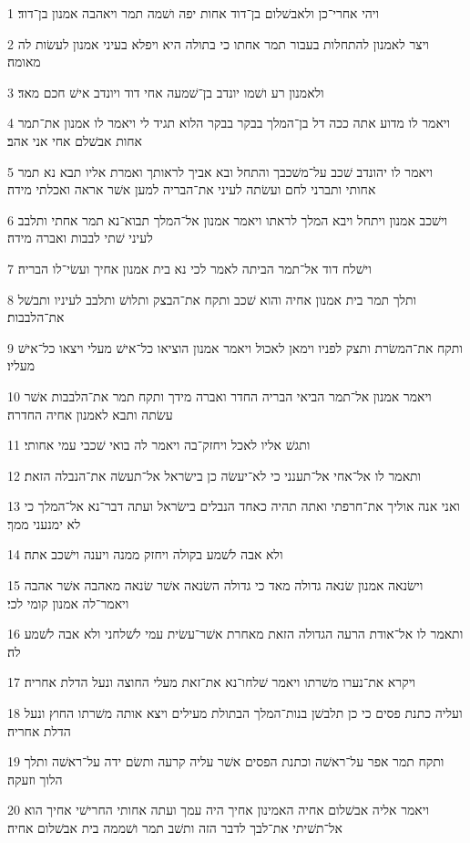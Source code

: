 \par 1 ויהי אחרי־כן ולאבשׁלום בן־דוד אחות יפה ושׁמה תמר ויאהבה אמנון בן־דוד׃
\par 2 ויצר לאמנון להתחלות בעבור תמר אחתו כי בתולה היא ויפלא בעיני אמנון לעשׂות לה מאומה׃
\par 3 ולאמנון רע ושׁמו יונדב בן־שׁמעה אחי דוד ויונדב אישׁ חכם מאד׃
\par 4 ויאמר לו מדוע אתה ככה דל בן־המלך בבקר בבקר הלוא תגיד לי ויאמר לו אמנון את־תמר אחות אבשׁלם אחי אני אהב׃
\par 5 ויאמר לו יהונדב שׁכב על־משׁכבך והתחל ובא אביך לראותך ואמרת אליו תבא נא תמר אחותי ותברני לחם ועשׂתה לעיני את־הבריה למען אשׁר אראה ואכלתי מידה׃
\par 6 וישׁכב אמנון ויתחל ויבא המלך לראתו ויאמר אמנון אל־המלך תבוא־נא תמר אחתי ותלבב לעיני שׁתי לבבות ואברה מידה׃
\par 7 וישׁלח דוד אל־תמר הביתה לאמר לכי נא בית אמנון אחיך ועשׂי־לו הבריה׃
\par 8 ותלך תמר בית אמנון אחיה והוא שׁכב ותקח את־הבצק ותלושׁ ותלבב לעיניו ותבשׁל את־הלבבות׃
\par 9 ותקח את־המשׂרת ותצק לפניו וימאן לאכול ויאמר אמנון הוציאו כל־אישׁ מעלי ויצאו כל־אישׁ מעליו׃
\par 10 ויאמר אמנון אל־תמר הביאי הבריה החדר ואברה מידך ותקח תמר את־הלבבות אשׁר עשׂתה ותבא לאמנון אחיה החדרה׃
\par 11 ותגשׁ אליו לאכל ויחזק־בה ויאמר לה בואי שׁכבי עמי אחותי׃
\par 12 ותאמר לו אל־אחי אל־תענני כי לא־יעשׂה כן בישׂראל אל־תעשׂה את־הנבלה הזאת׃
\par 13 ואני אנה אוליך את־חרפתי ואתה תהיה כאחד הנבלים בישׂראל ועתה דבר־נא אל־המלך כי לא ימנעני ממך׃
\par 14 ולא אבה לשׁמע בקולה ויחזק ממנה ויענה וישׁכב אתה׃
\par 15 וישׂנאה אמנון שׂנאה גדולה מאד כי גדולה השׂנאה אשׁר שׂנאה מאהבה אשׁר אהבה ויאמר־לה אמנון קומי לכי׃
\par 16 ותאמר לו אל־אודת הרעה הגדולה הזאת מאחרת אשׁר־עשׂית עמי לשׁלחני ולא אבה לשׁמע לה׃
\par 17 ויקרא את־נערו משׁרתו ויאמר שׁלחו־נא את־זאת מעלי החוצה ונעל הדלת אחריה׃
\par 18 ועליה כתנת פסים כי כן תלבשׁן בנות־המלך הבתולת מעילים ויצא אותה משׁרתו החוץ ונעל הדלת אחריה׃
\par 19 ותקח תמר אפר על־ראשׁה וכתנת הפסים אשׁר עליה קרעה ותשׂם ידה על־ראשׁה ותלך הלוך וזעקה׃
\par 20 ויאמר אליה אבשׁלום אחיה האמינון אחיך היה עמך ועתה אחותי החרישׁי אחיך הוא אל־תשׁיתי את־לבך לדבר הזה ותשׁב תמר ושׁממה בית אבשׁלום אחיה׃

